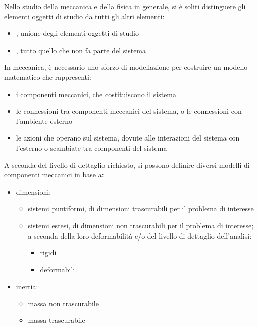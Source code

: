 \documentclass[letterpaper,10pt,italian]{jupyterBook}
\begin{document}
\sphinxAtStartPar
Nello studio della meccanica e della fisica in generale, si è soliti distinguere gli elementi oggetti di studio da tutti gli altri elementi:
\begin{itemize}
\item {} 
\sphinxAtStartPar
{}, unione degli elementi oggetti di studio

\item {} 
\sphinxAtStartPar
{}, tutto quello che non fa parte del sistema

\end{itemize}

\sphinxAtStartPar
In meccanica, è necessario uno sforzo di modellazione per costruire un modello matematico che rappresenti:
\begin{itemize}
\item {} 
\sphinxAtStartPar
i componenti meccanici, che costituiscono il sistema

\item {} 
\sphinxAtStartPar
le connessioni tra componenti meccanici del sistema, o le connessioni con l’ambiente esterno

\item {} 
\sphinxAtStartPar
le azioni che operano sul sistema, dovute alle interazioni del sistema con l’esterno o scambiate tra componenti del sistema

\end{itemize}

\sphinxAtStartPar
A seconda del livello di dettaglio richiesto, si possono definire diversi modelli di componenti meccanici in base a:
\begin{itemize}
\item {} 
\sphinxAtStartPar
dimensioni:
\begin{itemize}
\item {} 
\sphinxAtStartPar
sistemi puntiformi, di dimensioni trascurabili per il problema di interesse

\item {} 
\sphinxAtStartPar
sistemi estesi, di dimensioni non trascurabili per il problema di interesse; a seconda della loro deformabilità e/o del livello di dettaglio dell’analisi:
\begin{itemize}
\item {} 
\sphinxAtStartPar
rigidi

\item {} 
\sphinxAtStartPar
deformabili

\end{itemize}

\end{itemize}

\item {} 
\sphinxAtStartPar
inertia:
\begin{itemize}
\item {} 
\sphinxAtStartPar
massa non trascurabile

\item {} 
\sphinxAtStartPar
massa trascurabile

\end{itemize}

\end{itemize}
\end{document}
